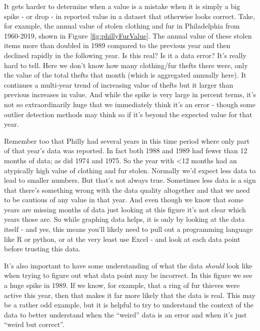 \documentclass[
]{krantz}
\begin{document}
It gets harder to determine when a value is a mistake when
it is simply a big spike - or drop - in reported value in a
dataset that otherwise looks correct. Take, for example, the
annual value of stolen clothing and fur in Philadelphia from
1960-2019, shown in Figure \ref{fig:phillyFurValue}. The
annual value of these stolen items more than doubled in 1989
compared to the previous year and then declined rapidly in
the following year. Is this real? Is it a data error? It's
really hard to tell. Here we don't know how many
clothing/fur thefts there were, only the value of the total
thefts that month (which is aggregated annually here). It
continues a multi-year trend of increasing value of thefts
but it larger than previous increases in value. And while
the spike is very large in percent terms, it's not so
extraordinarily huge that we immediately think it's an error
- though some outlier detection methods may think so if it's
beyond the expected value for that year.

Remember too that Philly had several years in this time
period where only part of that year's data was reported. In
fact both 1988 and 1989 had fewer than 12 months of data; as
did 1974 and 1975. So the year with \textless12 months had
an atypically high value of clothing and fur stolen.
Normally we'd expect less data to lead to smaller numbers.
But that's not always true. Sometimes less data is a sign
that there's something wrong with the data quality
altogether and that we need to be cautious of any value in
that year. And even though we know that some years are
missing months of data just looking at this figure it's not
clear which years those are. So while graphing data helps,
it is only by looking at the data itself - and yes, this
means you'll likely need to pull out a programming language
like R or python, or at the very least use Excel - and look
at each data point before trusting this data.

It's also important to have some understanding of what the
data \emph{should} look like when trying to figure out what
data point may be incorrect. In this figure we see a huge
spike in 1989. If we know, for example, that a ring of fur
thieves were active this year, then that makes it far more
likely that the data is real. This may be a rather odd
example, but it is helpful to try to understand the context
of the data to better understand when the ``weird'' data is
an error and when it's just ``weird but correct''.
\end{document}
